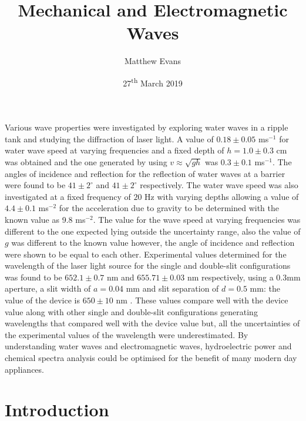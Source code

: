\documentclass{article}
\begin{document}
\title{Mechanical and Electromagnetic Waves} %
\author{Matthew Evans}%
\date{27\textsuperscript{th} March 2019} %
\maketitle %
\begin{onecolabstract}
\noindent
Various wave properties were investigated by exploring water waves in a ripple tank and studying the diffraction of laser light. A value of $ 0.18 \pm 0.05$ ms$^{-1}$ for water wave speed at varying frequencies and a fixed depth of $h = 1.0 \pm 0.3$ cm was obtained and the one generated by using $v \approx \sqrt{gh}$ \cite{Book02} was $ 0.3 \pm 0.1$ ms$^{-1}$. The angles of incidence and reflection for the reflection of water waves at a barrier were found to be $41 \pm 2^{\circ}$ and $41 \pm 2^{\circ}$ respectively. The water wave speed was also investigated at a fixed frequency of $20$ Hz with varying depths allowing a value of $4.4 \pm 0.1$ ms$^{-2}$ for the acceleration due to gravity to be determined with the known value as 9.8 ms$^{-2}$. The value for the wave speed at varying frequencies was different to the one expected lying outside the uncertainty range, also the value of $g$ was different to the known value however, the angle of incidence and reflection were shown to be equal to each other. Experimental values determined for the wavelength of the laser light source for the single and double-slit configurations was found to be $652.1 \pm 0.7$ nm and $655.71 \pm 0.03$ nm respectively, using a 0.3mm aperture, a slit width of $a = 0.04$ mm and slit separation of $d = 0.5$ mm: the value of the device is $650 \pm 10$ nm \cite{Web02}. These values compare well with the device value along with other single and double-slit configurations generating wavelengths that compared well with the device value but, all the uncertainties of the experimental values of the wavelength were underestimated. By understanding water waves and electromagnetic waves, hydroelectric power and chemical spectra analysis could be optimised for the benefit of many modern day appliances.

\end{onecolabstract}
\vspace{5mm} %


\section{Introduction}
\label{sec:introduction}
\end{document}
